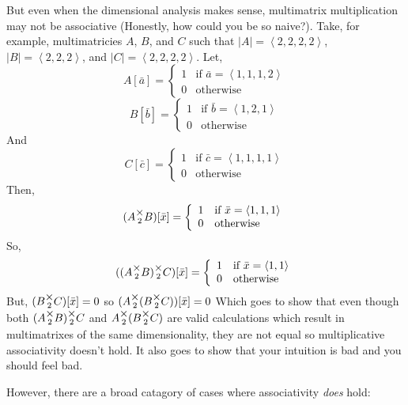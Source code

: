 \documentclass[12pt]{book}
\theoremstyle{definition}
\theoremstyle{plain}
\theoremstyle{ppart}
\theoremstyle{case}
\theoremstyle{solution}
\newcommand{\mmult}[1]{\text{\raisebox{1ex}{$\underset{#1}{\times}$}}}
\begin{document}
But even when the dimensional analysis makes sense, multimatrix multiplication
may not be associative (Honestly, how could you be so naive?). 
Take, for example, multimatricies $A$, $B$, and $C$ such
that $|A| = \left<2,2,2,2\right>$, $|B| = \left<2,2,2\right>$, and
$|C| = \left<2,2,2,2\right>$. Let,
\[
 A[\bar{a}] = 
  \left\{
    \begin{array}{ll}
      1 & \mbox{if } \bar{a} = \left<1,1,1,2\right> \\
      0 & \mbox{otherwise}
    \end{array}
  \right.
\]
\[
 B[\bar{b}] = 
  \left\{
    \begin{array}{ll}
      1 & \mbox{if } \bar{b} = \left<1,2,1\right> \\
      0 & \mbox{otherwise}
    \end{array}
  \right.
\]
And
\[
 C[\bar{c}] = 
  \left\{
    \begin{array}{ll}
      1 & \mbox{if } \bar{c} = \left<1,1,1,1\right> \\
      0 & \mbox{otherwise}
    \end{array}
  \right.
\]
Then,
\[
 (A \mmult{2} B)[\bar{x}] = 
  \left\{
    \begin{array}{ll}
      1 & \mbox{if } \bar{x} = \left<1,1,1\right> \\
      0 & \mbox{otherwise}
    \end{array}
  \right.
\]
So,
\[
 ((A \mmult{2} B) \mmult{2} C)[\bar{x}] = 
  \left\{
    \begin{array}{ll}
      1 & \mbox{if } \bar{x} = \left<1,1\right> \\
      0 & \mbox{otherwise}
    \end{array}
  \right.
\]
But, $(B \mmult{2} C)[\bar{x}] = 0$ so $(A \mmult{2} (B \mmult{2} C))[\bar{x}] = 0$
Which goes to show that even though both $(A \mmult{2} B) \mmult{2} C$ and
$A \mmult{2} (B \mmult{2} C)$ are valid calculations which result in multimatrixes
of the same dimensionality, they are not equal so multiplicative associativity
doesn't hold. It also goes to show that your intuition is bad and you should feel bad.

However, there are a broad catagory of cases where associativity \textit{does} hold:
\end{document}
